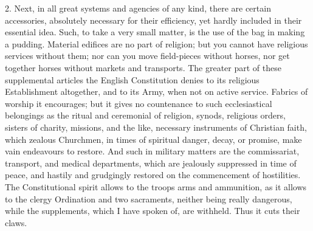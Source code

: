 2. Next, in all great systems and agencies of any
kind, there are certain accessories, absolutely necessary for their
efficiency, yet hardly included in their essential idea. Such, to take
a very small matter, is the use of the bag in making a pudding.
Material edifices are no part of religion; but you cannot have
religious services without them; nor can you move field-pieces without
horses, nor get together horses without markets and transports. The
greater part of these supplemental articles the English Constitution
denies to its religious Establishment altogether, and to its Army,
when not on active service. Fabrics of worship it encourages; but it
gives no countenance to such ecclesiastical belongings as the ritual
and ceremonial of religion, synods, religious orders, sisters of charity, missions, and the like, necessary instruments of Christian
faith, which zealous Churchmen, in times of spiritual danger, decay,
or promise, make vain endeavours to restore. And such in military
matters are the commissariat, transport, and medical departments,
which are jealously suppressed in time of peace, and hastily and
grudgingly restored on the commencement of hostilities. The
Constitutional spirit allows to the troops arms and ammunition, as it
allows to the clergy Ordination and two sacraments, neither being
really dangerous, while the supplements, which I have spoken of, are
withheld. Thus it cuts their claws.

